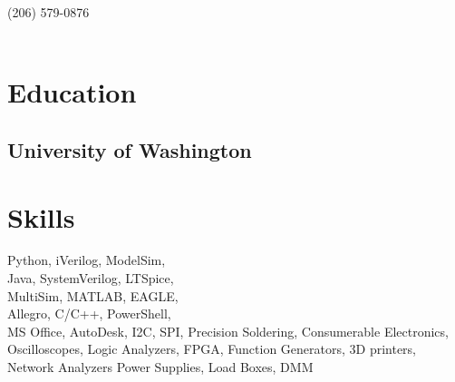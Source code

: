 \documentclass[]{hieudo-build}
\begin{document}
%
%
{
	\phone \hspace{0.1mm} (206) 579-0876\\
	\\
}
    
%
%
\begin{minipage}[t]{0.29\textwidth} 

\section{Education} 

\subsection{University of Washington}
\sectionsep

\section{Skills}
Python, iVerilog, ModelSim, \\Java, SystemVerilog, LTSpice, \\MultiSim, MATLAB, EAGLE, \\Allegro, C/C++, PowerShell, \\MS Office, AutoDesk, I2C, SPI, Precision Soldering, Consumerable Electronics, Oscilloscopes, Logic Analyzers, FPGA, Function Generators, 3D printers, Network Analyzers
Power Supplies, Load Boxes, DMM

\sectionsep

\end{minipage}
\end{document}
